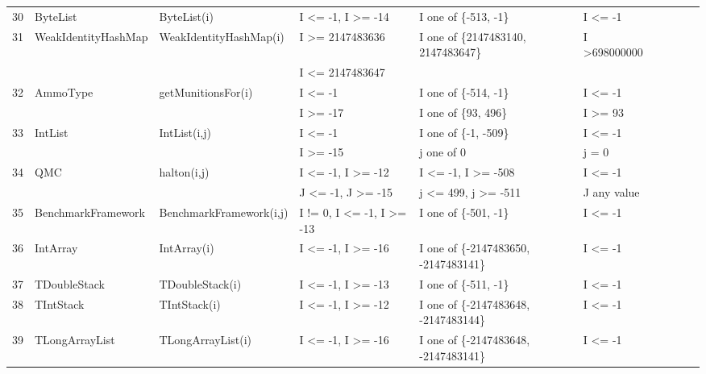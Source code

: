 \documentclass[conference]{IEEEtran}
\begin{document}
\begin{table}[h]
{\begin{tabular}{llllllllll}
30	& ByteList					& ByteList(i)					& I \textless= -1, I \textgreater= -14			& I one of \{-513, -1\}	 				& I \textless= -1						\\ 
31	& WeakIdentityHashMap		& WeakIdentityHashMap(i)		& I \textgreater= 2147483636				& I one of \{2147483140, 2147483647\}	& I \textgreater 698000000			\\ 
	&                                             &                                             & I \textless= 2147483647					& 										&  			   						\\
32	& AmmoType				& getMunitionsFor(i)			& I \textless= -1								& I one of \{-514, -1\}					& I \textless= -1 					\\ 			
	&                                             &                                             & I \textgreater= -17							& I one of \{93, 496\}						& I \textgreater= 93		   			\\
33	& IntList						& IntList(i,j)					& I \textless= -1								& I one of \{-1, -509\}					& I \textless= -1						\\ 		
	&                                             &                                             & I \textgreater= -15							& j one of {0}								& j = 0		   						\\
34	& QMC						& halton(i,j)					& I \textless= -1, I \textgreater= -12			& I \textless= -1, I \textgreater= -508		& I \textless= -1						\\ 
	&                                             &                                             & J \textless= -1, J \textgreater= -15			& j \textless= 499, j \textgreater= -511	& J any value			 		  		\\	
35	& BenchmarkFramework		& BenchmarkFramework(i,j)	& I != 0, I \textless= -1, I \textgreater= -13	& I one of \{-501, -1\}					& I \textless= -1						\\ 
36	& IntArray					& IntArray(i)					& I \textless= -1, I \textgreater= -16			& I one of \{-2147483650, -2147483141\}	& I \textless= -1						\\ 
37	& TDoubleStack				& TDoubleStack(i)			& I \textless= -1, I \textgreater= -13			& I one of \{-511, -1\}					& I \textless= -1						\\ 
38	& TIntStack					& TIntStack(i)				& I \textless= -1, I \textgreater= -12			& I one of \{-2147483648, -2147483144\}	& I \textless= -1						\\ 
39	& TLongArrayList				& TLongArrayList(i)			& I \textless= -1, I \textgreater= -16			& I one of \{-2147483648, -2147483141\}	& I \textless= -1						\\ 

\end{tabular}}
\end{table}
\end{document}
